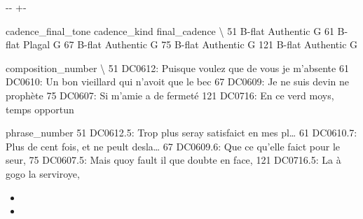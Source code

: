 \documentclass[letterpaper,10pt,english]{sphinxmanual}
\newlength\nbsphinxcodecellspacing
\begin{document}
{

\kern-\sphinxverbatimsmallskipamount\kern-\baselineskip
\kern+\FrameHeightAdjust\kern-\fboxrule
\vspace{\nbsphinxcodecellspacing}

\begin{sphinxVerbatim}[commandchars=\\\{\}]
\llap{\color{nbsphinxout}[31]:\,\hspace{\fboxrule}\hspace{\fboxsep}}    cadence\_final\_tone cadence\_kind final\_cadence  \textbackslash{}
51              B-flat    Authentic             G
61              B-flat       Plagal             G
67              B-flat    Authentic             G
75              B-flat    Authentic             G
121             B-flat    Authentic             G

                                  composition\_number  \textbackslash{}
51   DC0612: Puisque voulez que de vous je m'absente
61   DC0610: Un bon vieillard qui n'avoit que le bec
67              DC0609: Je ne suis devin ne prophète
75                    DC0607: Si m'amie a de fermeté
121          DC0716: En ce verd moys, temps opportun

                                         phrase\_number
51   DC0612.5: Trop plus seray satisfaict en mes pl{\ldots}
61   DC0610.7: Plus de cent fois, et ne peult desla{\ldots}
67        DC0609.6: Que ce qu'elle faict pour le seur,
75    DC0607.5: Mais quoy fault il que doubte en face,
121                  DC0716.5: La à gogo la serviroye,
\end{sphinxVerbatim}
}

\begin{itemize}
\item {} 
\item {} 
\end{itemize}
\end{document}
